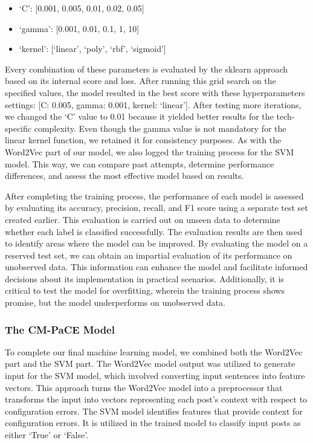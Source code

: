 \documentclass[english,bachelor]{swsLeipzig}
\begin{document}
\begin{itemize}
  \item `C': [0.001, 0.005, 0.01, 0.02, 0.05]
  \item `gamma': [0.001, 0.01, 0.1, 1, 10]
  \item `kernel': [`linear', `poly', `rbf', `sigmoid']
\end{itemize}

Every combination of these parameters is evaluated by the sklearn approach based on its internal score and loss. After 
running this grid search on the specified values, the model resulted in the best score with these hyperparameters settings: [C: 0.005, gamma: 0.001, kernel: `linear']. After testing more iterations, we changed the `C' value to 0.01 because it yielded better results for the tech-specific complexity. Even though the gamma value is not mandatory for the linear kernel function, we retained it for consistency purposes. As with the Word2Vec part of our model, we also logged the training process for the SVM model. This way, we can compare past attempts, determine performance differences, and assess the most effective model based on results.

After completing the training process, the performance of each model is assessed by evaluating its accuracy, 
precision, recall, and F1 score using a separate test set created earlier. This evaluation is carried out on unseen data to determine whether each label is classified successfully. The evaluation results are then used to identify areas where the model can be improved. By evaluating the model on a reserved test set, we can obtain an impartial evaluation of its performance on unobserved data. This information can enhance the model and facilitate informed decisions about its implementation in practical scenarios. Additionally, it is critical to test the model for overfitting, wherein the training process shows promise, but the model underperforms on unobserved data.

\subsubsection{The CM-PaCE Model}
To complete our final machine learning model, we combined both the Word2Vec part and the SVM part. The Word2Vec model 
output was utilized to generate input for the SVM model, which involved converting input sentences into feature vectors. This approach turns the Word2Vec model into a preprocessor that transforms the input into vectors representing each post's context with respect to configuration errors. The SVM model identifies features that provide context for configuration errors. It is utilized in the trained model to classify input posts as either `True' or `False'.
\end{document}

